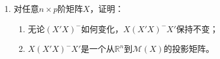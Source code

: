 \documentclass[10pt]{article}
\theoremstyle{definition}
\newtheorem*{solution}{解}
\theoremstyle{definition}
\begin{document}
\begin{enumerate}
\begin{solution}
\begin{enumerate}[label=(\roman*)]
                    另一个反例是$A=\begin{pmatrix}0\end{pmatrix}$，此时$A^-$可取$\begin{pmatrix}0\end{pmatrix}$或$\begin{pmatrix}42\end{pmatrix}$或$\begin{pmatrix}-3.14\end{pmatrix}$等。
                    认为退化的矩阵过于特殊的同学也可以自行构造对应的数量矩阵。
                \item
                    记矩阵$A$的秩为$r$，对$A$作满秩分解
                    \begin{equation*}
                        A=P
                        \begin{pmatrix}
                            \mathrm{I}_r & 0 \\
                            0 & 0
                        \end{pmatrix}Q
                    \end{equation*}
                    则矩阵$A$的广义逆的一般形式为
                    \begin{equation*}
                        A^-=Q^{-1}
                        \begin{pmatrix}
                            \mathrm{I}_r & B \\
                            C & D 
                        \end{pmatrix}P^{-1}
                    \end{equation*}
                    其中$B\, ,C\, ,D$分别是任意$r\times (s-r)\, ,(n-r)\times r\, ,(n-r)\times (s-r)$阶矩阵。
                    证明请参阅丘维声著《高等代数》第一版上册251-252页。
            \end{enumerate}
        \end{solution}

    \item	%
        对任意$n\times p$阶矩阵$X$，证明：
        \begin{enumerate}[label=(\roman*)]
            \item 无论$(X'X)^-$如何变化，$X(X'X)^-X'$保持不变；\\
            \item$X(X'X)^-X'$是一个从$\mathbb{R}^n$到$\mathcal{M}(X)$的投影矩阵。
        \end{enumerate}


\end{enumerate}
\end{document}
